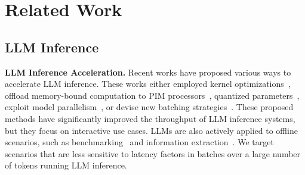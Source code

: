 \section{Related Work}

\subsection{LLM Inference}
\textbf{LLM Inference Acceleration.}
Recent works have proposed various ways to accelerate LLM inference.
These works either employed kernel optimizations~\cite{deepspeedinf, flashllm}, offload memory-bound computation to PIM processors~\cite{transpim, pimdl, neupims, attacc}, quantized parameters~\cite{kvquant, atom, llm-qat, llmint8}, exploit model parallelism~\cite{deepspeedinf, scaletrans}, or devise new batching strategies~\cite{orca, sarathi, dvabatch}.
These proposed methods have significantly improved the throughput of LLM inference systems, but they focus on interactive use cases.
LLMs are also actively applied to offline scenarios, such as benchmarking~\cite{liang2023holistic, NEURIPS2023_89e44582, NEURIPS2023_91f18a12, guo2023gpt4graph} and information extraction~\cite{narayan2018don, pu2023summarization, chang2024booookscore, goyal2022news, pang-etal-2023-long}. 
We target scenarios that are less sensitive to latency factors in batches over a large number of tokens running LLM inference.



